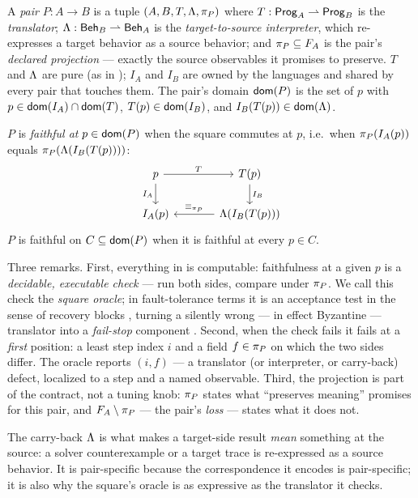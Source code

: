 \begin{definition}[Pair]
\label{def:pair}
A \emph{pair} $P : A \to B$ is a tuple $(A, B, T, \Lambda, \pi_P)$ where
$T : \mathsf{Prog}_{A} \rightharpoonup \mathsf{Prog}_{B}$ is the \emph{translator};
$\Lambda : \mathsf{Beh}_{B} \rightharpoonup \mathsf{Beh}_{A}$ is the
\emph{target-to-source interpreter}, which re-expresses a target behavior
as a source behavior; and $\pi_P \subseteq F_A$ is the pair's
\emph{declared projection} --- exactly the source observables it promises
to preserve. $T$ and $\Lambda$ are pure (as in );
$I_A$ and $I_B$ are owned by the languages and shared by every pair that
touches them. The pair's domain $\mathsf{dom}(P)$ is the set of $p$ with
$p \in \mathsf{dom}(I_A) \cap \mathsf{dom}(T)$, $T(p) \in \mathsf{dom}(I_B)$, and
$I_B(T(p)) \in \mathsf{dom}(\Lambda)$.
\end{definition}

\begin{definition}[Faithfulness]
\label{def:faithful}
$P$ is \emph{faithful at} $p \in \mathsf{dom}(P)$ when the square commutes at
$p$, i.e.\ when $\pi_P(I_A(p))$ equals
$\pi_P(\Lambda(I_B(T(p))))$:
\[
\begin{tikzcd}[column sep=large]
p \arrow[r, "T"] \arrow[d, "I_A"'] & T(p) \arrow[d, "I_B"] \\
I_A(p) & \carry(I_B(T(p))) \arrow[l, "\eqproj{\proj_P}"']
\end{tikzcd}
\]
$P$ is faithful on $C \subseteq \mathsf{dom}(P)$ when it is faithful at every
$p \in C$.
\end{definition}

Three remarks. First, everything in  is computable:
faithfulness at a given $p$ is a \emph{decidable, executable check} --- run
both sides, compare under $\pi_P$. We call this check the
\emph{square oracle}; in fault-tolerance terms it is an acceptance test
in the sense of recovery blocks \citep{randell1975recovery}, turning a
silently wrong --- in effect Byzantine --- translator into a
\emph{fail-stop} component \citep{schlichting1983failstop}. Second, when the check fails it fails at a
\emph{first} position: a least step index $i$ and a field
$f \in \pi_P$ on which the two sides differ. The oracle reports
$(i, f)$ --- a translator (or interpreter, or carry-back) defect, localized
to a step and a named observable. Third, the projection is part of the
contract, not a tuning knob: $\pi_P$ states what ``preserves meaning''
promises for this pair, and $F_A \setminus \pi_P$ --- the pair's
\emph{loss} --- states what it does not.

The carry-back $\Lambda$ is what makes a target-side result \emph{mean}
something at the source: a solver counterexample or a target trace is
re-expressed as a source behavior. It is pair-specific because the
correspondence it encodes is pair-specific; it is also why the square's
oracle is as expressive as the translator it checks.

